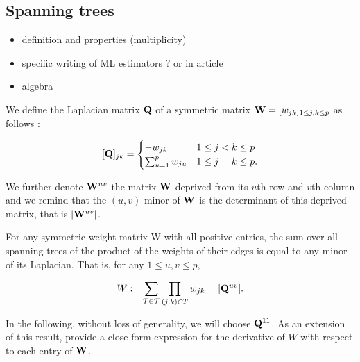   \subsection{Spanning trees}
  \begin{itemize}
  \item definition and properties (multiplicity)
  \item specific writing of ML estimators ? or in article
  \item algebra 
  \end{itemize}
  
 We define the Laplacian matrix ${\bf Q}$ of a symmetric matrix ${\bf W}=[w_{jk} ]_{1\leq j,k\leq p}$ as follows :

\[
 [{\bf Q}]_{jk}  =\begin{cases}
    -w_{jk}  & 1\leq j<k \leq p\\
    \sum_{u=1}^p w_{ju} & 1\leq j=k \leq p.
    \end{cases}
\]
 
We further denote ${\bf W}^{uv}$ the matrix ${\bf W}$ deprived from its $u$th row and $v$th column and we remind that the $(u, v)$-minor of ${\bf W}$ is the determinant of this deprived matrix, that is $|{\bf W}^{uv}|$.

\begin{theorem} \label{thm:MTT}
    For any symmetric weight matrix W with all positive entries, the sum over all spanning trees of the product of the weights of their edges is equal to any minor of its Laplacian. That is, for any $1 \leq u, v \leq p$,
 
   \[
    W := \sum_{T\in\mathcal{T}} \prod_{(j, k)\in T} w_{jk} = |{\bf Q}^{uv}|.
    \]
   
\end{theorem}    

In the following, without loss of generality, we will choose ${\bf Q}^{11}$. As an extension of this result, \cite{MeilaJaak} provide a close form expression for the derivative of $W$ with respect to each entry of ${\bf W}$. 

